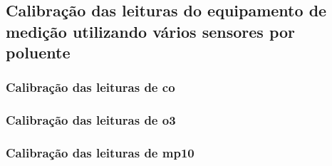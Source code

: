 \subsection{Calibração das leituras do equipamento de medição utilizando vários sensores por poluente}

\subsubsection{Calibração das leituras de \acrshort{co}}

\subsubsection{Calibração das leituras de \acrshort{o3}}

\subsubsection{Calibração das leituras de \acrshort{mp10}}